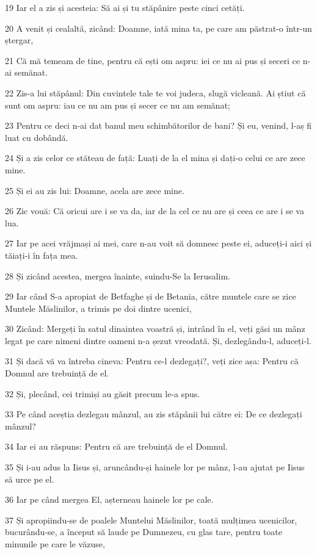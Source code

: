 \par 19 Iar el a zis și acesteia: Să ai și tu stăpânire peste cinci cetăți.
\par 20 A venit și cealaltă, zicând: Doamne, iată mina ta, pe care am păstrat-o într-un ștergar,
\par 21 Că mă temeam de tine, pentru că ești om aspru: iei ce nu ai pus și seceri ce n-ai semănat.
\par 22 Zis-a lui stăpânul: Din cuvintele tale te voi judeca, slugă vicleană. Ai știut că sunt om aspru: iau ce nu am pus și secer ce nu am semănat;
\par 23 Pentru ce deci n-ai dat banul meu schimbătorilor de bani? Și eu, venind, l-aș fi luat cu dobândă.
\par 24 Și a zis celor ce stăteau de față: Luați de la el mina și dați-o celui ce are zece mine.
\par 25 Și ei au zis lui: Doamne, acela are zece mine.
\par 26 Zic vouă: Că oricui are i se va da, iar de la cel ce nu are și ceea ce are i se va lua.
\par 27 Iar pe acei vrăjmași ai mei, care n-au voit să domnesc peste ei, aduceți-i aici și tăiați-i în fața mea.
\par 28 Și zicând acestea, mergea înainte, suindu-Se la Ierusalim.
\par 29 Iar când S-a apropiat de Betfaghe și de Betania, către muntele care se zice Muntele Măslinilor, a trimis pe doi dintre ucenici,
\par 30 Zicând: Mergeți în satul dinaintea voastră și, intrând în el, veți găsi un mânz legat pe care nimeni dintre oameni n-a șezut vreodată. Și, dezlegându-l, aduceți-l.
\par 31 Și dacă vă va întreba cineva: Pentru ce-l dezlegați?, veți zice așa: Pentru că Domnul are trebuință de el.
\par 32 Și, plecând, cei trimiși au găsit precum le-a spus.
\par 33 Pe când aceștia dezlegau mânzul, au zis stăpânii lui către ei: De ce dezlegați mânzul?
\par 34 Iar ei au răspuns: Pentru că are trebuință de el Domnul.
\par 35 Și i-au adus la Iisus și, aruncându-și hainele lor pe mânz, l-au ajutat pe Iisus să urce pe el.
\par 36 Iar pe când mergea El, așterneau hainele lor pe cale.
\par 37 Și apropiindu-se de poalele Muntelui Măslinilor, toată mulțimea ucenicilor, bucurându-se, a început să laude pe Dumnezeu, cu glas tare, pentru toate minunile pe care le văzuse,
